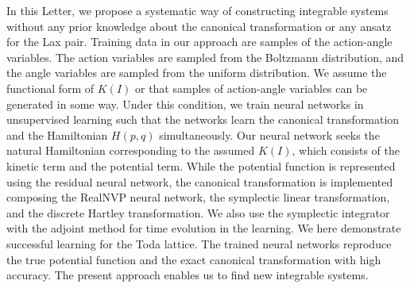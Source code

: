 In this Letter, we propose a systematic way of constructing integrable systems without any prior knowledge about the canonical transformation or any ansatz for the Lax pair.
Training data in our approach are samples of the action-angle variables.
The action variables are sampled from the Boltzmann distribution, and the angle variables are sampled from the uniform distribution.
We assume the functional form of $K(I)$ or that samples of action-angle variables can be generated in some way.
Under this condition, we train neural networks in unsupervised learning such that the networks learn the canonical transformation and the Hamiltonian $H(p,q)$ simultaneously.
Our neural network seeks the natural Hamiltonian corresponding to the assumed $K(I)$, which consists of the kinetic term and the potential term.
While the potential function is represented using the residual neural network, the canonical transformation is implemented composing the RealNVP neural network, the symplectic linear transformation, and the discrete Hartley transformation.
We also use the symplectic integrator with the adjoint method for time evolution in the learning.
We here demonstrate successful learning for the Toda lattice.
The trained neural networks reproduce the true potential function and the exact canonical transformation with high accuracy.
The present approach enables us to find new integrable systems.
